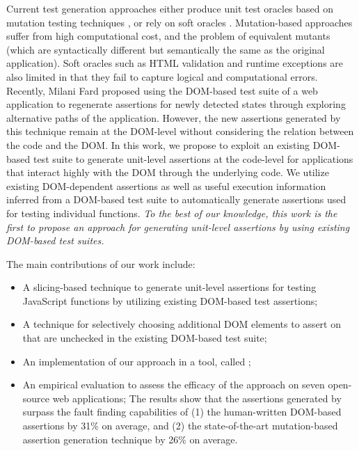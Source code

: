 Current test generation approaches either produce unit test oracles based on mutation testing techniques \cite{mirshokraie:icst15, fraser:tse12}, or rely on soft oracles \cite{artzi:icse11}. Mutation-based approaches suffer from high computational cost, and the problem of equivalent mutants (which are syntactically different but semantically the same as the original application).
Soft oracles such as HTML validation and runtime exceptions are also limited in that they fail to capture logical and computational errors. 
Recently, Milani Fard \etal \cite{milanifard:ase14} proposed using the DOM-based test suite of a web application to regenerate assertions for newly detected states through exploring alternative paths of the application. However, the new assertions generated by this technique remain at the DOM-level without considering the relation between the \javascript code and the DOM.
In this work, we propose to exploit an existing DOM-based test suite to generate unit-level assertions at the code-level for applications that interact highly with the DOM through the underlying \javascript code. We utilize
existing DOM-dependent assertions as well as useful execution information inferred from a DOM-based test suite to automatically generate assertions used for testing individual \javascript functions. 
{\em To the best of our knowledge, this work is the first to propose an approach for generating unit-level assertions by using existing DOM-based test suites.} 

The main contributions of our work include:
\begin{itemize}[noitemsep]
\item A slicing-based technique to generate unit-level assertions for testing JavaScr\-ipt functions by utilizing existing DOM-based test assertions;
\item A technique for selectively choosing additional DOM elements to assert on that are unchecked in the existing DOM-based test suite;
\item An implementation of our approach in a tool, called \atrina; 
\item An empirical evaluation to assess the efficacy of the approach on seven open-source web applications;
The results show that the assertions generated by \atrina surpass the fault finding capabilities of (1) the human-written DOM-based assertions by 31\% on average, and (2) the state-of-the-art mutation-based assertion generation technique by 26\% on average.
\end{itemize} 
